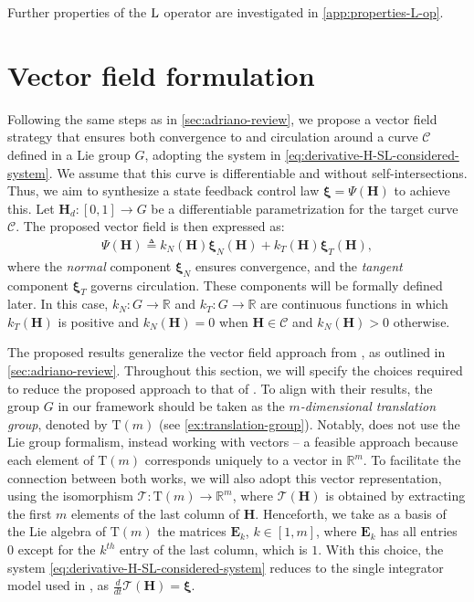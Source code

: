 Further properties of the $\operatorname{L}$ operator are investigated in \cref{app:properties-L-op}.

\section{Vector field formulation}
Following the same steps as in \cref{sec:adriano-review}, we propose a vector field strategy that ensures both convergence to and circulation around a curve $\mathcal{C}$ defined in a Lie group $G$, adopting the system in \eqref{eq:derivative-H-SL-considered-system}. We assume that this curve is differentiable and without self-intersections. Thus, we aim to synthesize a state feedback control law $\boldsymbol{\xi}=\Psi\left(\mathbf{H}\right)$ to achieve this. Let $\mathbf{H}_d:[0,1] \to G$ be a differentiable parametrization for the target curve $\mathcal{C}$. The proposed vector field is then expressed as:
\begin{align}
    \Psi\left(\mathbf{H}\right) \triangleq k_N(\mathbf{H})\boldsymbol{\xi}_N(\mathbf{H}) + k_T(\mathbf{H})\boldsymbol{\xi}_T(\mathbf{H}), \label{eq:vector-field-proposition}
\end{align}
where the \emph{normal} component $\boldsymbol{\xi}_N$ ensures convergence, and the \emph{tangent} component $\boldsymbol{\xi}_T$ governs circulation. These components will be formally defined later. In this case, $k_N: G \to \mathbb{R}$ and $k_T: G \to \mathbb{R}$ are continuous functions in which $k_T(\mathbf{H})$ is positive and $k_N(\mathbf{H})=0$ when $\mathbf{H} \in \mathcal{C}$ and $k_N(\mathbf{H}) > 0$ otherwise. 
\begin{remark}
    The proposed results generalize the vector field approach from \citet{Rezende2022}, as outlined in \cref{sec:adriano-review}. Throughout this section, we will specify the choices required to reduce the proposed approach to that of \citet{Rezende2022}. To align with their results, the group $G$ in our framework should be taken as the \emph{$m$-dimensional translation group}, denoted by $\text{T}(m)$ (see \cref{ex:translation-group}). Notably, \citet{Rezende2022}  does not use the Lie group formalism, instead working with vectors -- a feasible approach because each element of $\text{T}(m)$ corresponds uniquely to a vector in $\mathbb{R}^m$. To facilitate the connection between both works, we will also adopt this vector representation, using the isomorphism $\mathcal{T}: \text{T}(m) \to \mathbb{R}^m$, where $\mathcal{T}(\mathbf{H})$ is obtained by extracting the first $m$ elements of the last column of $\mathbf{H}$. Henceforth, we take as a basis of the Lie algebra of $\text{T}(m)$ the matrices $\mathbf{E}_k$, $k \in [1,m]$, where $\mathbf{E}_k$ has all entries $0$ except for the $k^{th}$ entry of the last column, which is $1$. With this choice, the system \eqref{eq:derivative-H-SL-considered-system} reduces to the single integrator model used in \citet{Rezende2022}, as $\frac{d}{dt} \mathcal{T}(\mathbf{H}) = \boldsymbol{\xi}$.  
\end{remark}


